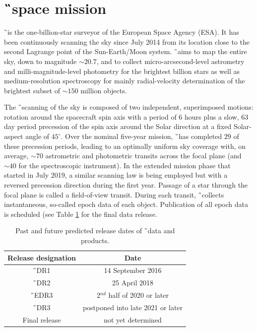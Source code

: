 \section{\G\ space mission}
\label{sec:gaia_data}
\G\ is the one-billion-star surveyor of the European Space Agency (ESA). It has been continuously scanning the sky since July 2014 from its location close to the second Lagrange point of the Sun-Earth/Moon system. \G\ aims to map the entire sky, down to magnitude $\sim20.7$, and to collect micro-arcsecond-level astrometry and milli-magnitude-level photometry for the brightest billion stars as well as medium-resolution spectroscopy for mainly radial-velocity determination of the brightest subset of $\sim150$ million objects. 

The \G\ scanning of the sky is composed of two independent, superimposed motions: rotation around the spacecraft spin axis with a period of 6 hours plus a slow, 63 day period precession of the spin axis around the Solar direction at a fixed Solar-aspect angle of $45^\circ$. Over the nominal five-year mission, \G\ has completed $29$ of these precession periods, leading to an optimally uniform sky coverage with, on average, $\sim70$ astrometric and photometric transits across the focal plane (and $\sim40$ for the spectroscopic instrument). In the extended mission phase that started in July 2019, a similar scanning law is being employed but with a reversed precession direction during the first year. Passage of a star through the focal plane is called a field-of-view transit. During each transit, \G\ collects instantaneous, so-called epoch data of each object. Publication of all epoch data is scheduled (see Table \ref{tab:gaia_drs} for the final data release.

\begin{table}
	\centering
	\caption{Past and future predicted release dates of \G\ data and products.}
	\begin{tabular}{c c}
		\hline
		Release designation & Date \\ 
		\hline \hline
		\G\ DR1 & 14 September 2016 \\
		\G\ DR2 & 25 April 2018 \\
		\G\ EDR3 & 2$^{nd}$ half of 2020 or later \\
		\G\ DR3 & postponed into late 2021 or later \\
		Final release & not yet determined \\
		\hline
	\end{tabular}
	\label{tab:gaia_drs}
\end{table}

